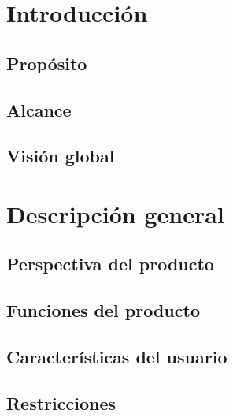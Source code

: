 \chapter{Introducción}
\label{ch:intro}


\section{Propósito}


\section{Alcance}


% 

\section{Visión global}


\chapter{Descripción general}
\label{Descripción general}

\section{Perspectiva del producto}


\section{Funciones del producto}


\section{Características del usuario}


\section{Restricciones}


